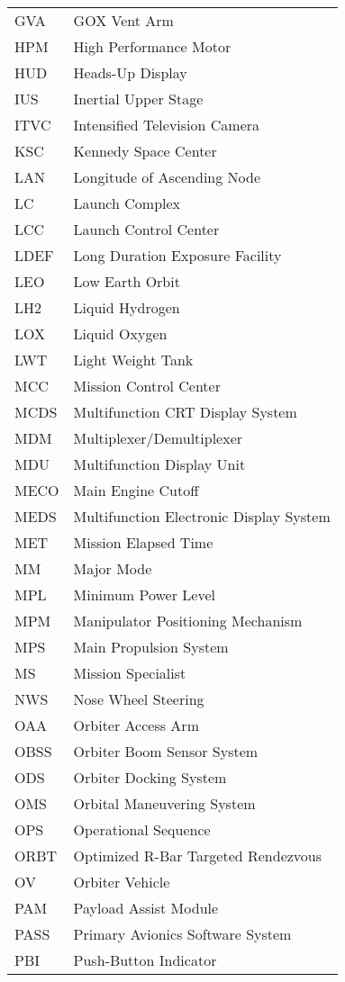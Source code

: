 \documentclass[Space_Shuttle_Vessel_Manual.tex]{subfiles}
\begin{document}
\begin{longtable}{l l }
GVA & GOX Vent Arm\\
HPM & High Performance Motor\\
HUD & Heads-Up Display\\
IUS & Inertial Upper Stage\\
ITVC & Intensified Television Camera\\
KSC & Kennedy Space Center\\
LAN & Longitude of Ascending Node\\
LC & Launch Complex\\
LCC & Launch Control Center\\
LDEF & Long Duration Exposure Facility\\
LEO & Low Earth Orbit\\
LH2 & Liquid Hydrogen\\
LOX & Liquid Oxygen\\
LWT & Light Weight Tank\\
MCC & Mission Control Center\\
MCDS & Multifunction CRT Display System\\
MDM & Multiplexer/Demultiplexer\\
MDU & Multifunction Display Unit\\
MECO & Main Engine Cutoff\\
MEDS & Multifunction Electronic Display System\\
MET & Mission Elapsed Time\\
MM & Major Mode\\
MPL & Minimum Power Level\\
MPM & Manipulator Positioning Mechanism\\
MPS & Main Propulsion System\\
MS & Mission Specialist\\
NWS & Nose Wheel Steering\\
OAA & Orbiter Access Arm\\
OBSS & Orbiter Boom Sensor System\\
ODS & Orbiter Docking System\\
OMS & Orbital Maneuvering System\\
OPS & Operational Sequence\\
ORBT & Optimized R-Bar Targeted Rendezvous\\
OV & Orbiter Vehicle\\
PAM & Payload Assist Module\\
PASS & Primary Avionics Software System\\
PBI & Push-Button Indicator\\

\end{longtable}
\end{document}
